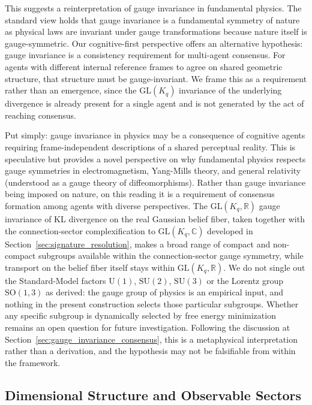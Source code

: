 \documentclass[11pt]{article}
\begin{document}
This suggests a reinterpretation of gauge invariance in fundamental physics. The standard view holds that gauge invariance is a fundamental symmetry of nature as physical laws are invariant under gauge transformations because nature itself is gauge-symmetric. Our cognitive-first perspective offers an alternative hypothesis: gauge invariance is a consistency requirement for multi-agent consensus. For agents with different internal reference frames to agree on shared geometric structure, that structure must be gauge-invariant. We frame this as a requirement rather than an emergence, since the $\mathrm{GL}(K_q)$ invariance of the underlying divergence is already present for a single agent and is not generated by the act of reaching consensus.

Put simply: gauge invariance in physics may be a consequence of cognitive agents requiring frame-independent descriptions of a shared perceptual reality. This is speculative but provides a novel perspective on why fundamental physics respects gauge symmetries in electromagnetism, Yang-Mills theory, and general relativity (understood as a gauge theory of diffeomorphisms). Rather than gauge invariance being imposed on nature, on this reading it is a requirement of consensus formation among agents with diverse perspectives. The $\mathrm{GL}(K_q, \mathbb{R})$ gauge invariance of KL divergence on the real Gaussian belief fiber, taken together with the connection-sector complexification to $\mathrm{GL}(K_q, \mathbb{C})$ developed in Section~\ref{sec:signature_resolution}, makes a broad range of compact and non-compact subgroups available within the connection-sector gauge symmetry, while transport on the belief fiber itself stays within $\mathrm{GL}(K_q, \mathbb{R})$. We do not single out the Standard-Model factors $\mathrm{U}(1)$, $\mathrm{SU}(2)$, $\mathrm{SU}(3)$ or the Lorentz group $\mathrm{SO}(1,3)$ as derived: the gauge group of physics is an empirical input, and nothing in the present construction selects those particular subgroups. Whether any specific subgroup is dynamically selected by free energy minimization remains an open question for future investigation. Following the discussion at Section~\ref{sec:gauge_invariance_consensus}, this is a metaphysical interpretation rather than a derivation, and the hypothesis may not be falsifiable from within the framework.

\subsection{Dimensional Structure and Observable Sectors}
\label{sec:observable_sectors}
\end{document}
